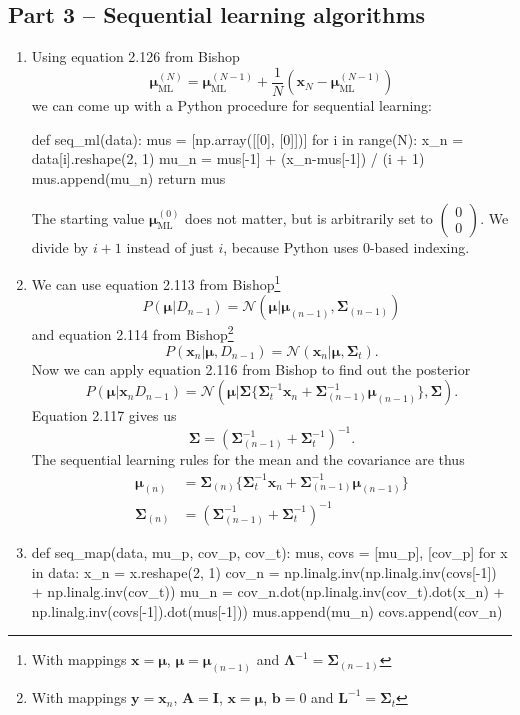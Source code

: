 \documentclass{article}
\begin{document}
\subsection*{Part 3 -- Sequential learning algorithms}
\begin{enumerate}
\item Using equation 2.126 from Bishop
$$
\bm{\mu}_\text{ML}^{(N)} = \bm{\mu}_\text{ML}^{(N-1)} + \frac{1}{N}(\bm{x}_N - \bm{\mu}_\text{ML}^{(N-1)})
$$
we can come up with a Python procedure for sequential learning:
\begin{python}
def seq_ml(data):
    mus = [np.array([[0], [0]])]
    for i in range(N):
        x_n = data[i].reshape(2, 1)
        mu_n = mus[-1] + (x_n-mus[-1]) / (i + 1)
        mus.append(mu_n)
    return mus
\end{python}
The starting value $\bm{\mu}_\text{ML}^{(0)}$ does not matter, but is arbitrarily set to $\begin{pmatrix}0 \\ 0\end{pmatrix} $. We divide by $i + 1$ instead of just $i$, because Python uses 0-based indexing.
\item
We can use equation 2.113 from Bishop\footnote{With mappings 
$\bm{x} = \bm{\mu}$, 
$\bm{\mu}=\bm{\mu}_{(n-1)}$ and 
$\bm{\Lambda}^{-1} = \bm{\Sigma}_{(n-1)} $}
$$
P(\bm{\mu} | D_{n-1}) = \mathcal{N}(\bm{\mu} | \bm{\mu}_{(n-1)}, \bm{\Sigma}_{(n-1)})
$$
and equation 2.114 from Bishop\footnote{With mappings
$\bm{y} = \bm{x}_n$,
$\bm{A} = \bm{I}$,
$\bm{x} = \bm{\mu}$,
$\bm{b} = 0$ and
$\bm{L}^{-1} = \bm{\Sigma}_t$}
$$
P(\bm{x}_n | \bm{\mu}, D_{n-1}) = \mathcal{N}(\bm{x}_n | \bm{\mu}, \bm{\Sigma}_t).
$$
Now we can apply equation 2.116 from Bishop to find out the posterior
$$
P(\bm{\mu} | \bm{x}_n D_{n-1}) = \mathcal{N}(\bm{\mu} | \bm{\Sigma}\{\bm{\Sigma}_t^{-1}\bm{x}_n + \bm{\Sigma}_{(n-1)}^{-1}\bm{\mu}_{(n-1)}\}, \bm{\Sigma}).
$$
Equation 2.117 gives us
$$
\bm{\Sigma} = (\bm{\Sigma}_{(n-1)}^{-1} + \bm{\Sigma}_t^{-1})^{-1}.
$$
The sequential learning rules for the mean and the covariance are thus
\begin{align*}
\bm{\mu}_{(n)} &=  \bm{\Sigma}_{(n)}\{\bm{\Sigma}_t^{-1}\bm{x}_n + \bm{\Sigma}_{(n-1)}^{-1}\bm{\mu}_{(n-1)}\} \\
\bm{\Sigma}_{(n)} &= (\bm{\Sigma}_{(n-1)}^{-1} + \bm{\Sigma}_t^{-1})^{-1}
\end{align*}
\item 
\begin{python}
def seq_map(data, mu_p, cov_p, cov_t):
    mus, covs = [mu_p], [cov_p]
    for x in data:
        x_n = x.reshape(2, 1)
        cov_n = np.linalg.inv(np.linalg.inv(covs[-1]) + np.linalg.inv(cov_t))
        mu_n = cov_n.dot(np.linalg.inv(cov_t).dot(x_n) + np.linalg.inv(covs[-1]).dot(mus[-1]))
        mus.append(mu_n)
        covs.append(cov_n)
        

\end{python}
\end{enumerate}
\end{document}
